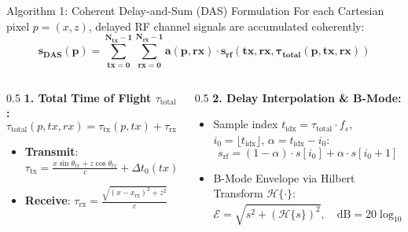 \documentclass[aspectratio=169,10pt]{beamer}
\begin{document}
\begin{frame}{Algorithm 1: Coherent Delay-and-Sum (DAS) Formulation}
  \vspace{-0.2cm}
  {\footnotesize For each Cartesian pixel $p = (x, z)$, delayed RF channel signals are accumulated coherently:
  $$\mathbf{s_{\text{DAS}}(p) = \sum_{tx=0}^{N_{\text{tx}}-1} \sum_{rx=0}^{N_{\text{rx}}-1} a(p, rx) \cdot s_{\text{rf}}\left(tx, rx, \tau_{\text{total}}(p, tx, rx)\right)}$$}
  \vspace{-0.3cm}
  \begin{columns}[T]
    \begin{column}{0.5\textwidth}
      \textbf{\footnotesize 1. Total Time of Flight $\tau_{\text{total}}$:}
      \scriptsize
      $$\tau_{\text{total}}(p, tx, rx) = \tau_{\text{tx}}(p, tx) + \tau_{\text{rx}}(p, rx)$$
      \begin{itemize}
        \item \textbf{Transmit}: $\tau_{\text{tx}} = \frac{x \sin \theta_{tx} + z \cos \theta_{tx}}{c} + \Delta t_0(tx)$
        \item \textbf{Receive}: $\tau_{\text{rx}} = \frac{\sqrt{(x - x_{\text{rx}})^2 + z^2}}{c}$
      \end{itemize}
    \end{column}
    \begin{column}{0.5\textwidth}
      \textbf{\footnotesize 2. Delay Interpolation \& B-Mode:}
      \scriptsize
      \begin{itemize}
        \item Sample index $t_{\text{idx}} = \tau_{\text{total}} \cdot f_s$, $i_0 = \lfloor t_{\text{idx}} \rfloor$, $\alpha = t_{\text{idx}} - i_0$:
        $$s_{\text{rf}} = (1 - \alpha) \cdot s[i_0] + \alpha \cdot s[i_0 + 1]$$
        \item B-Mode Envelope via Hilbert Transform $\mathcal{H}\{\cdot\}$:
        $$\mathcal{E} = \sqrt{s^2 + (\mathcal{H}\{s\})^2}, \quad \text{dB} = 20 \log_{10}\left(\frac{\mathcal{E}}{\max \mathcal{E}}\right)$$
      \end{itemize}
    \end{column}
  \end{columns}
\end{frame}
\end{document}
